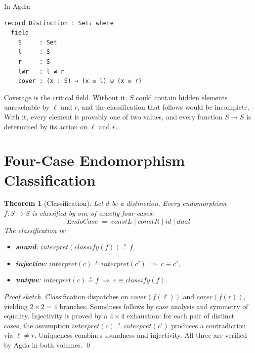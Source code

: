 \documentclass[11pt,a4paper]{article}
\newtheorem{theorem}{Theorem}[section]
\theoremstyle{definition}
\begin{document}
In Agda:

\begin{lstlisting}
record Distinction : Set₁ where
  field
    S     : Set
    l     : S
    r     : S
    l≠r   : l ≠ r
    cover : (x : S) → (x ≡ l) ⊎ (x ≡ r)
\end{lstlisting}

Coverage is the critical field.  Without it, $S$ could contain hidden
elements unreachable by $\ell$ and $r$, and the classification that
follows would be incomplete.  With it, every element is provably one of
two values, and every function $S \to S$ is determined by its action on
$\ell$ and $r$.

\section{Four-Case Endomorphism Classification}
\label{sec:four-cases}

\begin{theorem}[Classification]
\label{thm:classify}
Let $d$ be a distinction.  Every endomorphism $f : S \to S$ is
classified by one of exactly four cases:
\[
\mathit{EndoCase} \;=\; \mathit{constL} \mid \mathit{constR} \mid \mathit{id} \mid \mathit{dual}
\]
The classification is:
\begin{itemize}[nosep]
  \item \textbf{sound}: $\mathit{interpret}(\mathit{classify}(f)) \circeq f$,
  \item \textbf{injective}: $\mathit{interpret}(c) \circeq \mathit{interpret}(c') \;\Rightarrow\; c \equiv c'$,
  \item \textbf{unique}: $\mathit{interpret}(c) \circeq f \;\Rightarrow\; c \equiv \mathit{classify}(f)$.
\end{itemize}
\end{theorem}

\begin{proof}[Proof sketch]
Classification dispatches on $\mathit{cover}(f(\ell))$ and
$\mathit{cover}(f(r))$, yielding $2 \times 2 = 4$ branches.  Soundness
follows by case analysis and symmetry of equality.  Injectivity is proved
by a $4 \times 4$ exhaustion: for each pair of distinct cases, the
assumption $\mathit{interpret}(c) \circeq \mathit{interpret}(c')$ produces a
contradiction via $\ell \neq r$.  Uniqueness combines soundness and
injectivity.  All three are verified by Agda in both volumes.  \qed
\end{proof}
\end{document}

